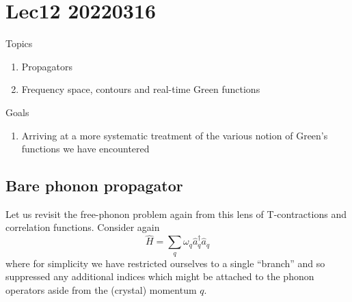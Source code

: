 \chapter{Lec12 20220316}

Topics

\begin{enumerate}
    \item Propagators
    \item Frequency space, contours and real-time Green functions
\end{enumerate}

Goals

\begin{enumerate}
    \item Arriving at a more systematic treatment of the various notion of Green's functions we have encountered
\end{enumerate}

\section{Bare phonon propagator}

Let us revisit the free-phonon problem again from this lens of T-contractions and correlation functions. Consider again
\[ \hat{H}=\sum_q{\omega _q\hat{a}_{q}^{\dagger}\hat{a}_q}\]
where for simplicity we have restricted ourselves to a single ``branch'' and so suppressed any additional indices which might be attached to the phonon operators aside from the (crystal) momentum $q$.

